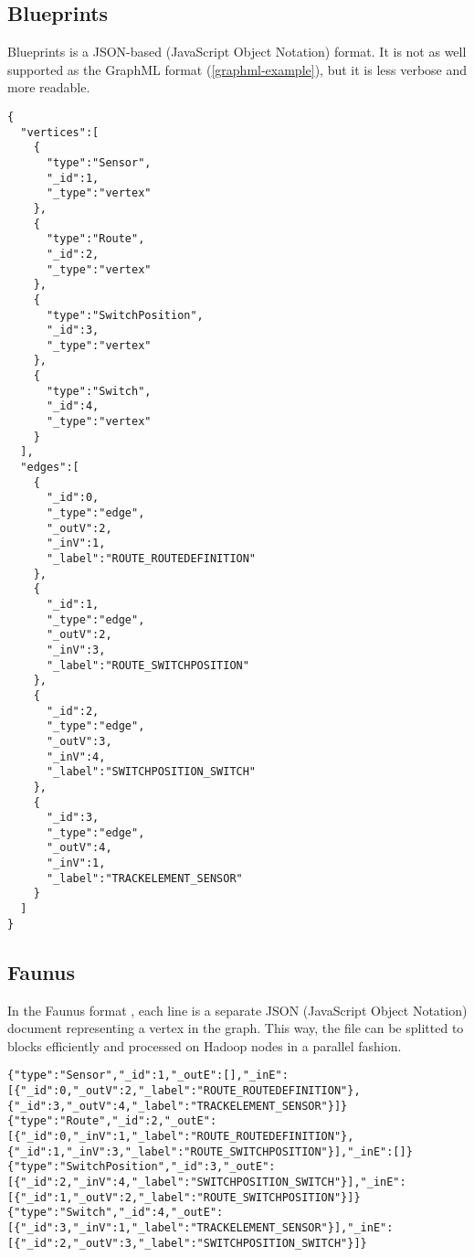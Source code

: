 \subsection{Blueprints \graphson{}}
\label{blueprints-graphson-example}

Blueprints \graphson{} \cite{BlueprintsGraphSON} is a JSON-based (JavaScript Object Notation) format. It is not as well supported as the GraphML format (\autoref{graphml-example}), but it is less verbose and more readable.

\lstset{language=json,firstnumber=1}
\begin{lstlisting}[caption=A graph based on the railway system metamodel stored in Blueprints \graphson{} format]
{
  "vertices":[
    {
      "type":"Sensor",
      "_id":1,
      "_type":"vertex"
    },
    {
      "type":"Route",
      "_id":2,
      "_type":"vertex"
    },
    {
      "type":"SwitchPosition",
      "_id":3,
      "_type":"vertex"
    },
    {
      "type":"Switch",
      "_id":4,
      "_type":"vertex"
    }
  ],
  "edges":[
    {
      "_id":0,
      "_type":"edge",
      "_outV":2,
      "_inV":1,
      "_label":"ROUTE_ROUTEDEFINITION"
    },
    {
      "_id":1,
      "_type":"edge",
      "_outV":2,
      "_inV":3,
      "_label":"ROUTE_SWITCHPOSITION"
    },
    {
      "_id":2,
      "_type":"edge",
      "_outV":3,
      "_inV":4,
      "_label":"SWITCHPOSITION_SWITCH"
    },
    {
      "_id":3,
      "_type":"edge",
      "_outV":4,
      "_inV":1,
      "_label":"TRACKELEMENT_SENSOR"
    }
  ]
}
\end{lstlisting}

\subsection{Faunus \graphson{}}
\label{faunus-graphson-example}

In the Faunus \graphson{} format \cite{FaunusGraphSON}, each line is a separate JSON (JavaScript Object Notation) document representing a vertex in the graph. This way, the file can be splitted to blocks efficiently and processed on Hadoop nodes in a parallel fashion.   

\begin{lstlisting}[caption=A graph based on the railway system metamodel stored in Faunus \graphson{} format]
{"type":"Sensor","_id":1,"_outE":[],"_inE":[{"_id":0,"_outV":2,"_label":"ROUTE_ROUTEDEFINITION"},{"_id":3,"_outV":4,"_label":"TRACKELEMENT_SENSOR"}]}
{"type":"Route","_id":2,"_outE":[{"_id":0,"_inV":1,"_label":"ROUTE_ROUTEDEFINITION"},{"_id":1,"_inV":3,"_label":"ROUTE_SWITCHPOSITION"}],"_inE":[]}
{"type":"SwitchPosition","_id":3,"_outE":[{"_id":2,"_inV":4,"_label":"SWITCHPOSITION_SWITCH"}],"_inE":[{"_id":1,"_outV":2,"_label":"ROUTE_SWITCHPOSITION"}]}
{"type":"Switch","_id":4,"_outE":[{"_id":3,"_inV":1,"_label":"TRACKELEMENT_SENSOR"}],"_inE":[{"_id":2,"_outV":3,"_label":"SWITCHPOSITION_SWITCH"}]}
\end{lstlisting}


